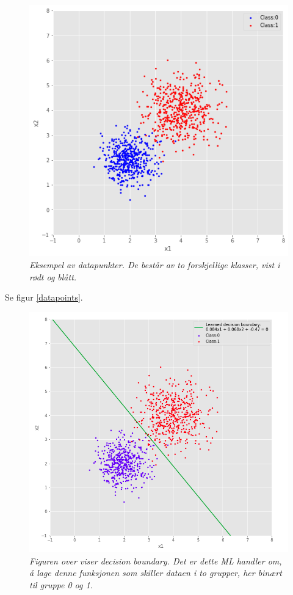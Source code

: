 \begin{figure} 
\begin{center} 
\includegraphics{figures/datapunkter}
\caption{\small \sl Eksempel av datapunkter. De består av to forskjellige klasser, vist i rødt og blått.\label{fig:datapoints}} 
\end{center} 
\end{figure} 

Se figur \ref{datapoints}. 

\begin{figure} 
\begin{center} 
\includegraphics{figures/decision_boundary}
\caption{\small \sl Figuren over viser decision boundary. Det er dette ML handler om, å lage denne funksjonen som skiller dataen i to grupper, her binært til gruppe 0 og 1.\label{fig:datapoints}} 
\end{center} 
\end{figure} 

